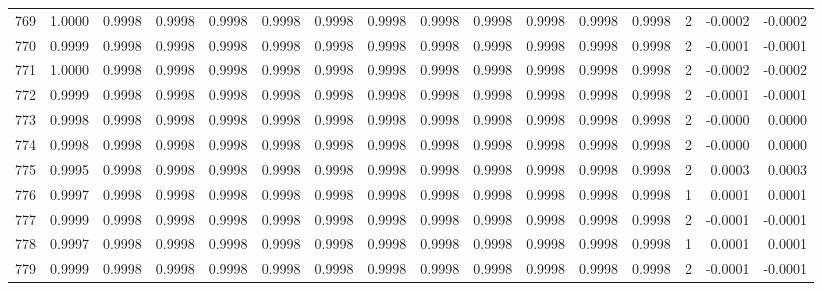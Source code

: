 \begin{tabular}{lrrrrrrrrrrrrrrr}
769 &      1.0000 &  0.9998 &  0.9998 &  0.9998 &  0.9998 &  0.9998 &  0.9998 &  0.9998 &  0.9998 &  0.9998 &   0.9998 &     0.9998 &      2 &                   -0.0002 &                    -0.0002 \\
770 &      0.9999 &  0.9998 &  0.9998 &  0.9998 &  0.9998 &  0.9998 &  0.9998 &  0.9998 &  0.9998 &  0.9998 &   0.9998 &     0.9998 &      2 &                   -0.0001 &                    -0.0001 \\
771 &      1.0000 &  0.9998 &  0.9998 &  0.9998 &  0.9998 &  0.9998 &  0.9998 &  0.9998 &  0.9998 &  0.9998 &   0.9998 &     0.9998 &      2 &                   -0.0002 &                    -0.0002 \\
772 &      0.9999 &  0.9998 &  0.9998 &  0.9998 &  0.9998 &  0.9998 &  0.9998 &  0.9998 &  0.9998 &  0.9998 &   0.9998 &     0.9998 &      2 &                   -0.0001 &                    -0.0001 \\
773 &      0.9998 &  0.9998 &  0.9998 &  0.9998 &  0.9998 &  0.9998 &  0.9998 &  0.9998 &  0.9998 &  0.9998 &   0.9998 &     0.9998 &      2 &                   -0.0000 &                     0.0000 \\
774 &      0.9998 &  0.9998 &  0.9998 &  0.9998 &  0.9998 &  0.9998 &  0.9998 &  0.9998 &  0.9998 &  0.9998 &   0.9998 &     0.9998 &      2 &                   -0.0000 &                     0.0000 \\
775 &      0.9995 &  0.9998 &  0.9998 &  0.9998 &  0.9998 &  0.9998 &  0.9998 &  0.9998 &  0.9998 &  0.9998 &   0.9998 &     0.9998 &      2 &                    0.0003 &                     0.0003 \\
776 &      0.9997 &  0.9998 &  0.9998 &  0.9998 &  0.9998 &  0.9998 &  0.9998 &  0.9998 &  0.9998 &  0.9998 &   0.9998 &     0.9998 &      1 &                    0.0001 &                     0.0001 \\
777 &      0.9999 &  0.9998 &  0.9998 &  0.9998 &  0.9998 &  0.9998 &  0.9998 &  0.9998 &  0.9998 &  0.9998 &   0.9998 &     0.9998 &      2 &                   -0.0001 &                    -0.0001 \\
778 &      0.9997 &  0.9998 &  0.9998 &  0.9998 &  0.9998 &  0.9998 &  0.9998 &  0.9998 &  0.9998 &  0.9998 &   0.9998 &     0.9998 &      1 &                    0.0001 &                     0.0001 \\
779 &      0.9999 &  0.9998 &  0.9998 &  0.9998 &  0.9998 &  0.9998 &  0.9998 &  0.9998 &  0.9998 &  0.9998 &   0.9998 &     0.9998 &      2 &                   -0.0001 &                    -0.0001 \\

\end{tabular}
